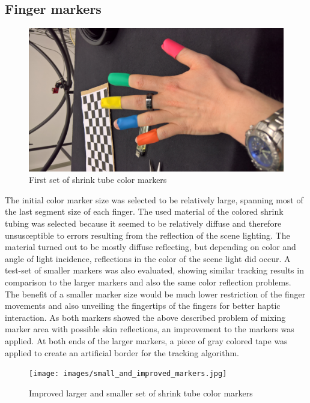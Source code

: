 \subsection{Finger markers}
\begin{figure} 
\centering
\includegraphics[width=\textwidth/2,angle=-90]{images/color_markers_hand.jpg}
\caption{First set of shrink tube color markers }
\label{img:first_set_color_markers}
\end{figure}
The initial color marker size was selected to be relatively large, spanning most of the last segment size of each finger.
The used material of the colored shrink tubing was selected because it seemed to be relatively diffuse and therefore unsusceptible to errors resulting from the reflection of the scene lighting. The material turned out to be mostly diffuse reflecting, but depending on color and angle of light incidence, reflections in the color of the scene light did occur.
A test-set of smaller markers was also evaluated, showing similar tracking results in comparison to the larger markers and also the same color reflection problems.\\The benefit of a smaller marker size would be much lower restriction of the finger movements and also unveiling the fingertips of the fingers for better haptic interaction.
As both markers showed the above described problem of mixing marker area with possible skin reflections, an improvement to the markers was applied. At both ends of the larger markers, a piece of gray colored tape was applied to create an artificial border for the tracking algorithm.
\begin{figure}[H]
\centering
\texttt{[image: images/small\_and\_improved\_markers.jpg]}
\caption{Improved larger and smaller set of shrink tube color markers }
\label{img:second_color_markers}
\end{figure}
